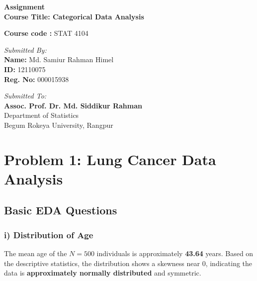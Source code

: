 \documentclass[12pt]{article}
\begin{document}
\begin{titlepage}
    \begin{center}
        \vspace*{1cm}
        
        \Huge
        \textbf{Assignment}\\
        
        
        \vspace{0.5cm}
        \LARGE
        \textbf{Course Title: Categorical Data Analysis}
        
       \textbf{Course code :} STAT 4104
        
        \vspace{2cm}
    
        
       
        
                \emph{Submitted By:}\\
                \textbf{Name:} Md. Samiur Rahman Himel \\
                \textbf{ID:} 12110075 \\
                \textbf{Reg. No:} 000015938
        \vspace{2cm}
        
                \emph{Submitted To:} \\
                \textbf{Assoc. Prof. Dr. Md. Siddikur Rahman} \\
                Department of Statistics \\
                Begum Rokeya University, Rangpur
        
        \vfill
        
    \end{center}
\end{titlepage}

\newpage
\tableofcontents
\newpage




\section{Problem 1: Lung Cancer Data Analysis}

\subsection{Basic EDA Questions}

\subsubsection{i) Distribution of Age}
The mean age of the $N=500$ individuals is approximately \textbf{43.64} years. Based on the descriptive statistics, the distribution shows a skewness near 0, indicating the data is \textbf{approximately normally distributed} and symmetric.
\end{document}
